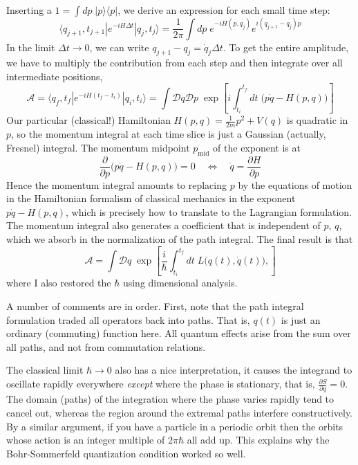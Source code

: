 \documentclass[12pt]{article}
\begin{document}
Inserting a $1=\int dp\; |p\rangle \langle p|$, we derive an expression
for each small time step:
\begin{equation}
  \langle q_{j+1}, t_{j+1} | e^{-i H \Delta t} | q_j, t_j \rangle =
  \frac{1}{2\pi} \int dp\;
  e^{-iH(p,q_j)} e^{i (q_{j+1}-q_j) p}
\end{equation}
In the limit $\Delta t\to 0$, we can write $q_{j+1} - q_j = \dot{q}_j
\Delta t$. To get the entire amplitude, we have to multiply the
contribution from each step and then integrate over all intermediate
positions,
\begin{equation}
  \mathcal{A} = 
  \langle q_f, t_f | e^{-i H (t_f-t_i)} | q_i, t_i \rangle =
  \int \mathcal{D}q \mathcal{D}p \;
  \exp \left[
    i \int_{t_i}^{t_f} dt \; \big(p \dot{q} - H(p,q) \big)
  \right]
\end{equation}
Our particular (classical!) Hamiltonian $H(p, q) = \tfrac{1}{2m} p^2 +
V(q)$ is quadratic in $p$, so the momentum integral at each time slice
is just a Gaussian (actually, Fresnel) integral. The momentum midpoint
$p_\text{mid}$ of the exponent is at
\begin{equation}
  \frac{\partial}{\partial p} \big(p \dot{q} - H(p,q) \big) = 0 
  \quad \Leftrightarrow \quad
  \dot{q} = \frac{\partial H}{\partial p}
\end{equation}
Hence the momentum integral amounts to replacing $p$ by the equations
of motion in the Hamiltonian formalism of classical mechanics in the
exponent $p \dot{q} - H(p,q)$, which is precisely how to translate to
the Lagrangian formulation. The momentum integral also generates a
coefficient that is independent of $p$, $q$, which we absorb in the
normalization of the path integral. The final result is that
\begin{equation}
  \mathcal{A} = 
  \int \mathcal{D}q \;
  \exp \left[
    \frac{i}{\hbar} \int_{t_i}^{t_f} dt \; L\big(q(t), \dot{q}(t) \big),
  \right]
\end{equation}
where I also restored the $\hbar$ using dimensional analysis.

A number of comments are in order. First, note that the path integral
formulation traded all operators back into paths. That is, $q(t)$ is
just an ordinary (commuting) function here. All quantum effects arise
from the sum over all paths, and not from commutation relations.

The classical limit $\hbar\to 0$ also has a nice interpretation, it
causes the integrand to oscillate rapidly everywhere \emph{except}
where the phase is stationary, that is, $\frac{\partial S}{\partial q}
= 0$. The domain (paths) of the integration where the phase varies
rapidly tend to cancel out, whereas the region around the extremal
paths interfere constructively. By a similar argument, if you have a
particle in a periodic orbit then the orbits whose action is an
integer multiple of $2\pi\hbar$ all add up. This explains why the
Bohr-Sommerfeld quantization condition worked so well.
\end{document}
